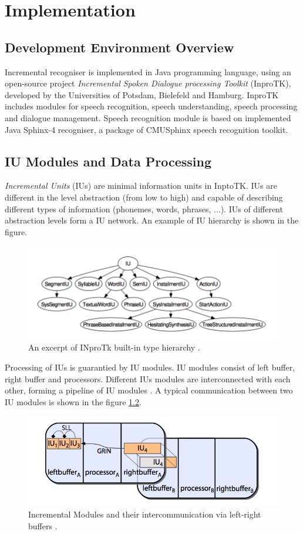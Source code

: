 \chapter{Implementation}
\label{chap:implem}
\section {Development Environment Overview}
Incremental recogniser is implemented in Java programming language, using
an open-source project \textit {Incremental Spoken Dialogue processing
Toolkit} (InproTK), developed by the Universities of Potsdam, Bielefeld and
Hamburg. InproTK includes modules for speech recognition, speech understanding,
speech processing and dialogue management. Speech recognition module is based on
implemented Java Sphinx-4 recogniser, a package of CMUSphinx speech recognition toolkit. 
\section {IU Modules and Data Processing}
\textit {Incremental Units} (IUs) are minimal information units in InptoTK.
IUs are different in the level abstraction (from low to high) and capable of
describing different types of information (phonemes, words, phrases, ...). IUs
of different abstraction levels form a IU network. An example of IU hierarchy is
shown in the figure.
\begin{figure}[htbp]
  \centering
    \includegraphics[width=1.0\textwidth]{images/IUs.png}
 \caption{ An excerpt of INproTk built-in type hierarchy \parencite
 {baumann2013:phd}.}
  \label{fig:IUs}
\end {figure}
Processing of IUs is guarantied by IU modules. IU
modules consist of left buffer, right buffer and processors.  
Different IUs modules are interconnected with each other, forming a pipeline of IU modules \parencite {baumann2013:phd}. A typical
communication between two IU modules is shown in the figure \ref{fig:IUs}.
\begin{figure}[htbp]
  \centering
    \includegraphics[width=1.0\textwidth]{images/iuandbuffer.png}
 \caption{ Incremental Modules and their intercommunication via left-right
 buffers \parencite {baumann2013:phd}.}
  \label{fig:IUs}
\end {figure}
